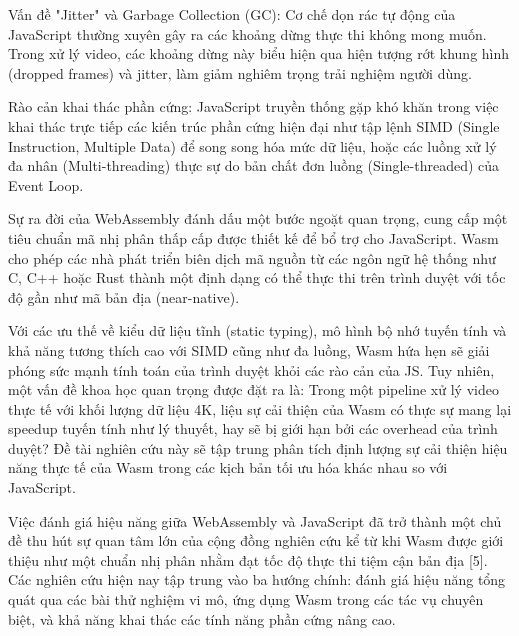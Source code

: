 Vấn đề "Jitter" và Garbage Collection (GC): Cơ chế dọn rác tự động của JavaScript thường xuyên gây ra các khoảng dừng thực thi không mong muốn. Trong xử lý video, các khoảng dừng này biểu hiện qua hiện tượng rớt khung hình (dropped frames) và jitter, làm giảm nghiêm trọng trải nghiệm người dùng.


Rào cản khai thác phần cứng: JavaScript truyền thống gặp khó khăn trong việc khai thác trực tiếp các kiến trúc phần cứng hiện đại như tập lệnh SIMD (Single Instruction, Multiple Data) để song song hóa mức dữ liệu, hoặc các luồng xử lý đa nhân (Multi-threading) thực sự do bản chất đơn luồng (Single-threaded) của Event Loop.



Sự ra đời của WebAssembly đánh dấu một bước ngoặt quan trọng, cung cấp một tiêu chuẩn mã nhị phân thấp cấp được thiết kế để bổ trợ cho JavaScript. Wasm cho phép các nhà phát triển biên dịch mã nguồn từ các ngôn ngữ hệ thống như C, C++ hoặc Rust thành một định dạng có thể thực thi trên trình duyệt với tốc độ gần như mã bản địa (near-native).


Với các ưu thế về kiểu dữ liệu tĩnh (static typing), mô hình bộ nhớ tuyến tính và khả năng tương thích cao với SIMD cũng như đa luồng, Wasm hứa hẹn sẽ giải phóng sức mạnh tính toán của trình duyệt khỏi các rào cản của JS. Tuy nhiên, một vấn đề khoa học quan trọng được đặt ra là: Trong một pipeline xử lý video thực tế với khối lượng dữ liệu 4K, liệu sự cải thiện của Wasm có thực sự mang lại speedup tuyến tính như lý thuyết, hay sẽ bị giới hạn bởi các overhead của trình duyệt? Đề tài nghiên cứu này sẽ tập trung phân tích định lượng sự cải thiện hiệu năng thực tế của Wasm trong các kịch bản tối ưu hóa khác nhau so với JavaScript.



Việc đánh giá hiệu năng giữa WebAssembly và JavaScript đã trở thành một chủ đề thu hút sự quan tâm lớn của cộng đồng nghiên cứu kể từ khi Wasm được giới thiệu như một chuẩn nhị phân nhằm đạt tốc độ thực thi tiệm cận bản địa [5]. Các nghiên cứu hiện nay tập trung vào ba hướng chính: đánh giá hiệu năng tổng quát qua các bài thử nghiệm vi mô, ứng dụng Wasm trong các tác vụ chuyên biệt, và khả năng khai thác các tính năng phần cứng nâng cao.



